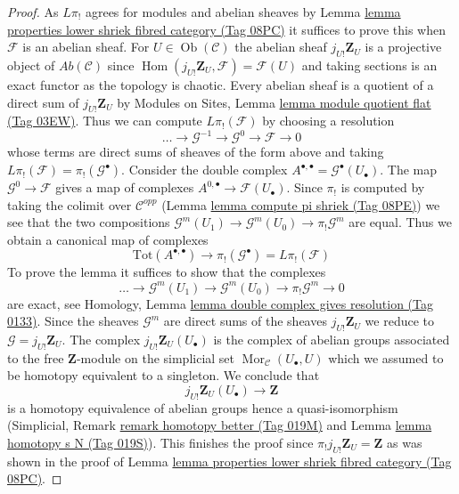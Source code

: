 \documentclass{amsart}
\theoremstyle{plain}
\theoremstyle{definition}
\theoremstyle{remark}
\numberwithin{equation}{subsection}
\def\Hom{\mathop{\mathrm{Hom}}\nolimits}
\def\Mor{\mathop{\mathrm{Mor}}\nolimits}
\def\Ob{\mathop{\mathrm{Ob}}\nolimits}
\begin{document}
\begin{proof}
As $L\pi_!$ agrees for modules and abelian sheaves by
Lemma \href{https://stacks.math.columbia.edu/tag/08PC}{lemma properties lower shriek fibred category (Tag 08PC)}
it suffices to prove this when $\mathcal{F}$ is an abelian sheaf.
For $U \in \Ob(\mathcal{C})$ the abelian sheaf $j_{U!}\mathbf{Z}_U$
is a projective object of $\textit{Ab}(\mathcal{C})$ since
$\Hom(j_{U!}\mathbf{Z}_U, \mathcal{F}) = \mathcal{F}(U)$
and taking sections is an exact functor as the topology is chaotic.
Every abelian sheaf is a quotient of a direct sum of $j_{U!}\mathbf{Z}_U$
by Modules on Sites, Lemma \href{https://stacks.math.columbia.edu/tag/03EW}{lemma module quotient flat (Tag 03EW)}.
Thus we can compute $L\pi_!(\mathcal{F})$ by choosing a resolution
$$
\ldots \to \mathcal{G}^{-1} \to \mathcal{G}^0 \to \mathcal{F} \to 0
$$
whose terms are direct sums of sheaves of the form above and taking
$L\pi_!(\mathcal{F}) = \pi_!(\mathcal{G}^\bullet)$. Consider the
double complex
$A^{\bullet, \bullet} = \mathcal{G}^\bullet(U_\bullet)$.
The map $\mathcal{G}^0 \to \mathcal{F}$ gives a map of complexes
$A^{0, \bullet} \to \mathcal{F}(U_\bullet)$.
Since $\pi_!$ is computed by taking the colimit over
$\mathcal{C}^{opp}$ (Lemma \href{https://stacks.math.columbia.edu/tag/08PE}{lemma compute pi shriek (Tag 08PE)})
we see that the two compositions
$\mathcal{G}^m(U_1) \to \mathcal{G}^m(U_0) \to \pi_!\mathcal{G}^m$
are equal. Thus we obtain a canonical map of complexes
$$
\text{Tot}(A^{\bullet, \bullet})
\longrightarrow
\pi_!(\mathcal{G}^\bullet) = L\pi_!(\mathcal{F})
$$
To prove the lemma it suffices to show that the complexes
$$
\ldots \to \mathcal{G}^m(U_1) \to \mathcal{G}^m(U_0) \to
\pi_!\mathcal{G}^m \to 0
$$
are exact, see Homology, Lemma
\href{https://stacks.math.columbia.edu/tag/0133}{lemma double complex gives resolution (Tag 0133)}.
Since the sheaves $\mathcal{G}^m$ are direct sums of the sheaves
$j_{U!}\mathbf{Z}_U$ we reduce to $\mathcal{G} = j_{U!}\mathbf{Z}_U$.
The complex $j_{U!}\mathbf{Z}_U(U_\bullet)$
is the complex of abelian groups associated to the free
$\mathbf{Z}$-module on the simplicial set
$\Mor_\mathcal{C}(U_\bullet, U)$ which we assumed to be homotopy
equivalent to a singleton. We conclude that
$$
j_{U!}\mathbf{Z}_U(U_\bullet) \to \mathbf{Z}
$$
is a homotopy equivalence of abelian groups hence a quasi-isomorphism
(Simplicial, Remark \href{https://stacks.math.columbia.edu/tag/019M}{remark homotopy better (Tag 019M)} and
Lemma \href{https://stacks.math.columbia.edu/tag/019S}{lemma homotopy s N (Tag 019S)}). This finishes the proof
since $\pi_!j_{U!}\mathbf{Z}_U = \mathbf{Z}$
as was shown in the proof of
Lemma \href{https://stacks.math.columbia.edu/tag/08PC}{lemma properties lower shriek fibred category (Tag 08PC)}.
\end{proof}
\end{document}
